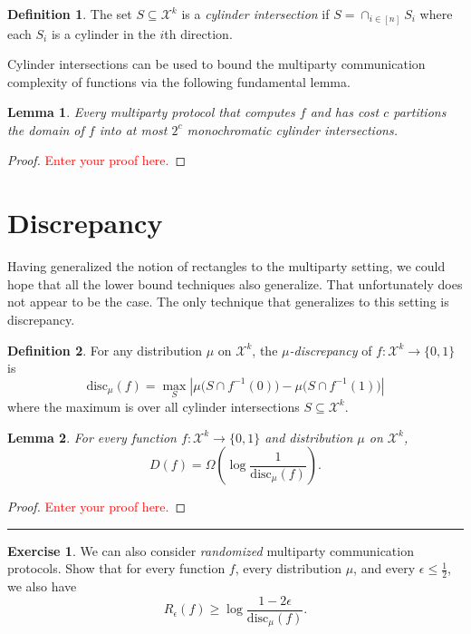 \documentclass[11pt]{amsart}
\theoremstyle{plain}
\newtheorem{lemma}{Lemma}
\theoremstyle{definition}
\newtheorem{definition}{Definition}
\newtheorem{exercise}{Exercise}
\theoremstyle{plain}
\newcommand{\calX}{\mathcal{X}}
\newcommand{\disc}{\mathrm{disc}}
\newcommand{\exercises}{\bigskip \noindent\rule{8cm}{0.4pt} \medskip}
\newcommand{\replacethistext}[1]{\textcolor{red}{#1}}
\begin{document}
\begin{definition}
The set $S \subseteq \calX^k$ is a \emph{cylinder intersection} if $S = \cap_{i \in [n]} S_i$ where each $S_i$ is a cylinder in the $i$th direction.
\end{definition}

Cylinder intersections can be used to bound the multiparty communication complexity of functions via the following fundamental lemma.

\begin{lemma}
Every multiparty protocol that computes $f$ and has cost $c$ partitions the domain of $f$ into at most $2^c$ monochromatic cylinder intersections.
\end{lemma}

\begin{proof}
\replacethistext{Enter your proof here.}
\end{proof}



\newpage 
\section{Discrepancy}

Having generalized the notion of rectangles to the multiparty setting, we could hope that all the lower bound techniques also generalize. That unfortunately does not appear to be the case. The only technique that generalizes to this setting is discrepancy.

\begin{definition}
For any distribution $\mu$ on $\calX^k$, 
the \emph{$\mu$-discrepancy} of $f : \calX^k \to \{0,1\}$ is
\[
\disc_\mu(f) = \max_{S} 
\left| \mu\big( S \cap f^{-1}(0) \big) - \mu\big( S \cap f^{-1}(1)\big) \right|
\]
where the maximum is over all cylinder intersections $S \subseteq \calX^k$.
\end{definition}


\begin{lemma}
For every function $f : \calX^k \to \{0,1\}$ and distribution $\mu$ on $\calX^k$,
\[
D(f) = \Omega\left( \log \frac{1}{\disc_\mu(f)}\right).
\]
\end{lemma}

\begin{proof}
\replacethistext{Enter your proof here.}
\end{proof}

\exercises

\begin{exercise}
We can also consider \emph{randomized} multiparty communication protocols. Show that for every function $f$, every distribution $\mu$, and every $\epsilon \le \frac12$, we also have
\[
R_\epsilon(f) \ge \log \frac{1-2\epsilon}{\disc_\mu(f)}.
\]
\end{exercise}
\end{document}
